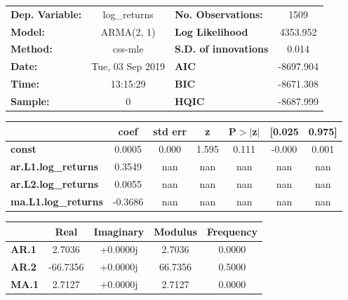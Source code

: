 \begin{center}
\begin{tabular}{lclc}
\toprule
\textbf{Dep. Variable:}     &        log\_returns       & \textbf{  No. Observations:  } &            1509            \\
\textbf{Model:}             &         ARMA(2, 1)        & \textbf{  Log Likelihood     } &          4353.952          \\
\textbf{Method:}            &          css-mle          & \textbf{  S.D. of innovations} &           0.014            \\
\textbf{Date:}              &      Tue, 03 Sep 2019     & \textbf{  AIC                } &         -8697.904          \\
\textbf{Time:}              &          13:15:29         & \textbf{  BIC                } &         -8671.308          \\
\textbf{Sample:}            &             0             & \textbf{  HQIC               } &         -8687.999          \\
\bottomrule
\end{tabular}
\begin{tabular}{lcccccc}
                            & \textbf{coef} & \textbf{std err} & \textbf{z} & \textbf{P$> |$z$|$} & \textbf{[0.025} & \textbf{0.975]}  \\
\midrule
\textbf{const}              &       0.0005  &        0.000     &     1.595  &         0.111        &       -0.000    &        0.001     \\
\textbf{ar.L1.log\_returns} &       0.3549  &          nan     &       nan  &           nan        &          nan    &          nan     \\
\textbf{ar.L2.log\_returns} &       0.0055  &          nan     &       nan  &           nan        &          nan    &          nan     \\
\textbf{ma.L1.log\_returns} &      -0.3686  &          nan     &       nan  &           nan        &          nan    &          nan     \\
\bottomrule
\end{tabular}
\begin{tabular}{lcccc}
              & \textbf{            Real} & \textbf{         Imaginary} & \textbf{         Modulus} & \textbf{        Frequency}  \\
\midrule
\textbf{AR.1} &                2.7036     &                +0.0000j     &                2.7036     &                0.0000       \\
\textbf{AR.2} &              -66.7356     &                +0.0000j     &               66.7356     &                0.5000       \\
\textbf{MA.1} &                2.7127     &                +0.0000j     &                2.7127     &                0.0000       \\
\bottomrule
\end{tabular}
\end{center}
